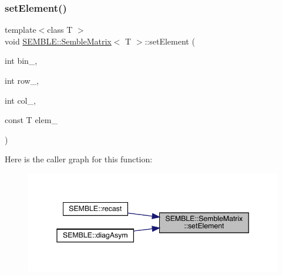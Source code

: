 \mbox{\label{structSEMBLE_1_1SembleMatrix_a1b68e0d33a0d6699d94590135e3f4163}} 
\subsubsection{\texorpdfstring{setElement()}{setElement()}\hspace{0.1cm}{\footnotesize\ttfamily [2/4]}}
{\footnotesize\ttfamily template$<$class T $>$ \\
void \mbox{\hyperlink{structSEMBLE_1_1SembleMatrix}{S\+E\+M\+B\+L\+E\+::\+Semble\+Matrix}}$<$ T $>$\+::set\+Element (\begin{DoxyParamCaption}\item[{int}]{bin\+\_\+,  }\item[{int}]{row\+\_\+,  }\item[{int}]{col\+\_\+,  }\item[{const T}]{elem\+\_\+ }\end{DoxyParamCaption})}

Here is the caller graph for this function\+:
\nopagebreak
\begin{figure}[H]
\begin{center}
\leavevmode
\includegraphics[width=345pt]{df/d87/structSEMBLE_1_1SembleMatrix_a1b68e0d33a0d6699d94590135e3f4163_icgraph}
\end{center}
\end{figure}
\mbox{\label{structSEMBLE_1_1SembleMatrix_a5840aaaabbade4c2714f3bfd99d150a8}} 

